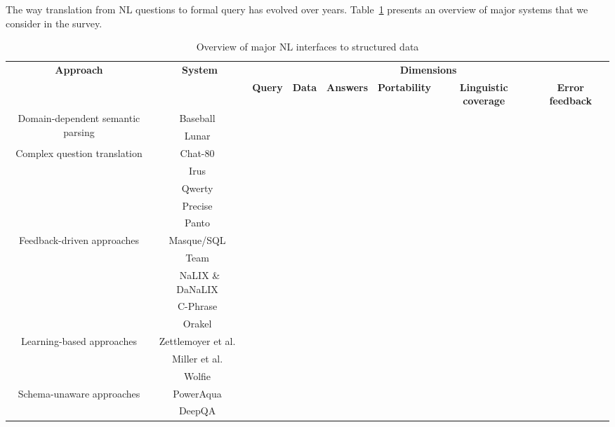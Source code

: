 \documentclass[10pt,journal,letterpaper,compsoc]{IEEEtran}
\begin{document}
The way translation from NL questions to formal query has evolved over years.
Table~\ref{tab:overview} presents an overview of major systems that we consider
in the survey.

\begin{table}
\centering
\begin{tabular}{|c|c|c|c|c|c|c|c|}\hline
\multirow{2}{*}{\bf Approach} & \multirow{2}{*}{\bf System} &
\multicolumn{6}{c|}{\bf Dimensions}\\\cline{3-8}
& & {\bf Query} & {\bf Data} & {\bf Answers} & {\bf Portability} & {\bf
Linguistic coverage} & {\bf Error feedback}\\\hline\hline 
\multirow{2}{*}{Domain-dependent semantic parsing} & {\sc
Baseball}~\cite{Green:1961:BAQ:1460690.1460714} & & & & & & \\\cline{2-8}
& {\sc Lunar}~\cite{Woods:1973:PNL:1499586.1499695} & & & & & & \\\hline
\multirow{5}{*}{Complex question translation} & {\sc
Chat-80}~\cite{Warren:1982:EEA:972942.972944} & & & & & & \\\cline{2-8}
& {\sc Irus}~\cite{Bates:1983:IRU:511793.511804} & & & & & & \\\cline{2-8}
& {\sc Qwerty}~\cite{Nelken:2000:QTD:992730.992808} & & & & & & \\\cline{2-8}
& {\sc
Precise}~\cite{Popescu:2004:MNL:1220355.1220376,Popescu:2003:TTN:604045.604070}
& & & & & & \\\cline{2-8}
& {\sc Panto}~\cite{Wang:2007:PPN:1419662.1419706} & & & & & & \\\hline
\multirow{5}{*}{Feedback-driven approaches} &
{\sc Masque/SQL}~\cite{Androutsopoulos93masque} & & & & & & \\\cline{2-8}
& {\sc Team}~\cite{Grosz:1987:TED:25672.25674} & & & & & & \\\cline{2-8}
& {\sc NaLIX} \& {\sc DaNaLIX}~\cite{Li:2005:NIN:1066157.1066281} & & & & & &
\\\cline{2-8}
& {\sc C-Phrase}~\cite{Minock:2010:CSB:1715942.1716190} & & & & & &
\\\cline{2-8}
& {\sc
Orakel}~\cite{Cimiano:2007:PNL:1216295.1216330} & & & & & & \\\hline
\multirow{3}{*}{Learning-based approaches} & Zettlemoyer
et al.~\cite{DBLP:conf/uai/ZettlemoyerC05} & & & & & & \\\cline{2-8}
& Miller et al.~\cite{Miller:1996:FSA:981863.981871} & & & & & & \\\cline{2-8}
& {\sc Wolfie}~\cite{Thompson:2003:AWM:1622420.1622421} & & & & & &
\\\hline
\multirow{2}{*}{Schema-unaware approaches} & {\sc
PowerAqua}~\cite{DBLP:conf/esws/LopezMU06} & & & & & & \\\cline{2-8}
 & {\sc DeepQA}~\cite{DBLP:journals/aim/FerrucciBCFGKLMNPSW10} & & & & & &
 \\\hline
\end{tabular}
\caption{Overview of major NL interfaces to structured data}
\label{tab:overview}
\end{table}
\end{document}
